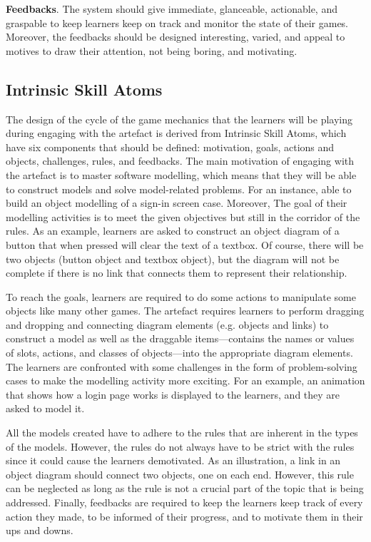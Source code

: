 \documentclass[runningheads,a4paper]{llncs}
\begin{document}
\textbf{Feedbacks}. The system should give immediate, glanceable, actionable, and graspable to keep learners keep on track and monitor the state of their games. Moreover, the feedbacks should be designed interesting, varied, and appeal to motives to draw their attention, not being boring, and motivating. 

\subsection{Intrinsic Skill Atoms}
The design of the cycle of the game mechanics that the learners will be playing during engaging with the artefact is derived from Intrinsic Skill Atoms, which have six components that should be defined: motivation, goals, actions and objects, challenges, rules, and feedbacks. The main motivation of engaging with the artefact is to master software modelling, which means that they will be able to construct models and solve model-related problems. For an instance, able to build an object modelling of a sign-in screen case. Moreover, The goal of their modelling activities is to meet the given objectives but still in the corridor of the rules. As an example, learners are asked to construct an object diagram of a button that when pressed will clear the text of a textbox. Of course, there will be two objects (button object and textbox object), but the diagram will not be complete if there is no link that connects them to represent their relationship. 

To reach the goals, learners are required to do some actions to manipulate some objects like many other games. The artefact requires learners to perform dragging and dropping and connecting diagram elements (e.g. objects and links) to construct a model as well as the draggable items---contains the names or values of slots, actions, and classes of objects---into the appropriate diagram elements. The learners are confronted with some challenges in the form of problem-solving cases to make the modelling activity more exciting. For an example, an animation that shows how a login page works is displayed to the learners, and they are asked to model it. 

All the models created have to adhere to the rules that are inherent in the types of the models. However, the rules do not always have to be strict with the rules since it could cause the learners demotivated. As an illustration, a link in an object diagram should connect two objects, one on each end. However, this rule can be neglected as long as the rule is not a crucial part of the topic that is being addressed. Finally, feedbacks are required to keep the learners keep track of every action they made, to be informed of their progress, and to motivate them in their ups and downs.
\end{document}
